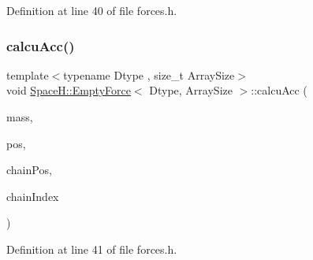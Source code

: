 Definition at line 40 of file forces.\+h.

\mbox{\label{struct_space_h_1_1_empty_force_aef0a45bc07150151ac18c6e180784e56}} 
\subsubsection{\texorpdfstring{calcu\+Acc()}{calcuAcc()}\hspace{0.1cm}{\footnotesize\ttfamily [3/4]}}
{\footnotesize\ttfamily template$<$typename Dtype , size\+\_\+t Array\+Size$>$ \\
void \mbox{\hyperlink{struct_space_h_1_1_empty_force}{Space\+H\+::\+Empty\+Force}}$<$ Dtype, Array\+Size $>$\+::calcu\+Acc (\begin{DoxyParamCaption}\item[{const \mbox{\hyperlink{struct_space_h_1_1_empty_force_afdeb66410650cdb1e2e3b1e1fd79540c}{Scalar\+Array}} \&}]{mass,  }\item[{const \mbox{\hyperlink{struct_space_h_1_1_empty_force_a06ad868879a6fa5def9c7f9fd75fffde}{Vector\+Array}} \&}]{pos,  }\item[{const \mbox{\hyperlink{struct_space_h_1_1_empty_force_a06ad868879a6fa5def9c7f9fd75fffde}{Vector\+Array}} \&}]{chain\+Pos,  }\item[{const \mbox{\hyperlink{struct_space_h_1_1_empty_force_a25e0bd933dd3715e315c1abdb6843c36}{Index\+Array}} \&}]{chain\+Index }\end{DoxyParamCaption})\hspace{0.3cm}{\ttfamily [inline]}}



Definition at line 41 of file forces.\+h.

\mbox{\label{struct_space_h_1_1_empty_force_a60c8642978737f561503d41d3dee90d7}} 
